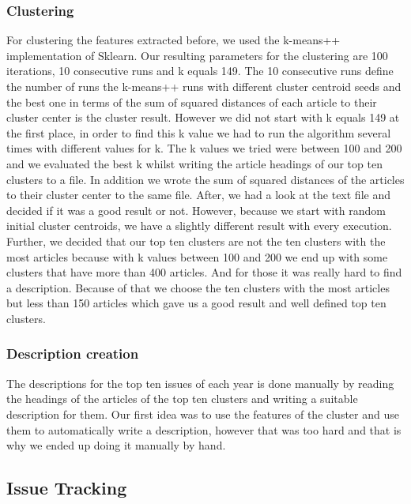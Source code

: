 \subsubsection{Clustering}
For clustering the features extracted before, we used the k-means++ implementation of Sklearn. Our resulting parameters for the clustering are 100 iterations, 10 consecutive runs and k equals 149. The 10 consecutive runs define the number of runs the k-means++ runs with different cluster centroid seeds and the best one in terms of the sum of squared distances of each article to their cluster center is the cluster result. However we did not start with k equals 149 at the first place, in order to find this k value we had to run the algorithm several times with different values for k. The k values we tried were between 100 and 200 and we evaluated the best k whilst writing the article headings of our top ten clusters to a file. In addition we wrote the sum of squared distances of the articles to their cluster center to the same file. After, we had a look at the text file and decided if it was a good result or not. However, because we start with random initial cluster centroids, we have a slightly different result with every execution. Further, we decided that our top ten clusters are not the ten clusters with the most articles because with k values between 100 and 200 we end up with some clusters that have more than 400 articles. And for those it was really hard to find a description. Because of that we choose the ten clusters with the most articles but less than 150 articles which gave us a good result and well defined top ten clusters.

\subsubsection{Description creation}
The descriptions for the top ten issues of each year is done manually by reading the headings of the articles of the top ten clusters and writing a suitable description for them. Our first idea was to use the features of the cluster and use them to automatically write a description, however that was too hard and that is why we ended up doing it manually by hand.

\subsection{Issue Tracking}


